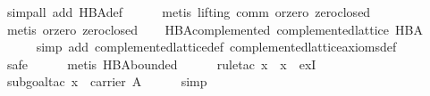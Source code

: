 \begin{isabellebody}
\ {}simp{}all\ add{}\ HBA{}def{}\isanewline
\ \ \ \ \isamarkupfalse%
\ {}metis\ {}lifting{}\ comm\ or{}zero\ zero{}closed{}\isanewline
\ \ \ \ \isamarkupfalse%
\ {}metis\ or{}zero\ zero{}closed{}%
\endisatagproof
{\isafoldproof}%
%
\isadelimproof
\isanewline
%
\endisadelimproof
\isanewline
\ \ \isamarkupfalse%
\ HBA{}complemented{}\ {}complemented{}lattice\ HBA{}\isanewline
%
\isadelimproof
\ \ \ \ %
\endisadelimproof
%
\isatagproof
{}\isamarkupfalse%
\ {}simp\ add{}\ complemented{}lattice{}def\ complemented{}lattice{}axioms{}def{}\isanewline
\ \ \ \ \isamarkupfalse%
\ safe\isanewline
\ \ \ \ \isamarkupfalse%
\ {}metis\ HBA{}bounded{}\isanewline
\ \ \ \ \isamarkupfalse%
\ {}rule{}tac\ x\ {}\ {}{}x{}\ \ exI{}\isanewline
\ \ \ \ \isamarkupfalse%
\ {}subgoal{}tac\ {}{}x\ {}\ carrier\ A{}{}\isanewline
\ \ \ \ \isamarkupfalse%
\ simp\isanewline
\ \ \ \ \isamarkupfalse%

\end{isabellebody}
